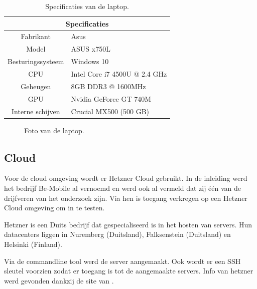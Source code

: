 \begin{table}[!htb]
	\centering
	\begin{tabular}{c l}
		\hline
		\multicolumn{2}{c}{\textbf{Specificaties}} \\
		\hline
		Fabrikant & Asus \\
		\hline
		Model & ASUS x750L \\
		\hline		
        Besturingssysteem & Windows 10\\
        \hline
		CPU & Intel Core i7 4500U @ 2.4 GHz  \\
		\hline
		Geheugen & 8GB DDR3 @ 1600MHz \\
		\hline
		GPU & Nvidia GeForce GT 740M \\
		\hline
		Interne schijven & Crucial MX500 (500 GB) \\
		\hline
	\end{tabular}
	\caption{Specificaties van de laptop.}
	\label{tab:specs_desktop }
\end{table}

\begin{figure}[!htb]
	\caption{Foto van de laptop.}
	\label{fig:asustest}
\end{figure}

\subsection{Cloud}
Voor de cloud omgeving wordt er Hetzner Cloud gebruikt. In de inleiding werd het bedrijf Be-Mobile al vernoemd en werd ook al vermeld dat zij één van de drijfveren van het onderzoek zijn. Via hen is toegang verkregen op een Hetzner Cloud omgeving om in te testen. 

Hetzner is een Duits bedrijf dat gespecialiseerd is in het hosten van servers. Hun datacenters liggen in Nuremberg (Duitsland), Falksenstein (Duitsland) en Helsinki (Finland). 

Via de commandline tool werd de server aangemaakt. Ook wordt er een SSH sleutel voorzien zodat er toegang is tot de aangemaakte servers. Info van hetzner werd gevonden dankzij de site van \autocite{hetzner}.


